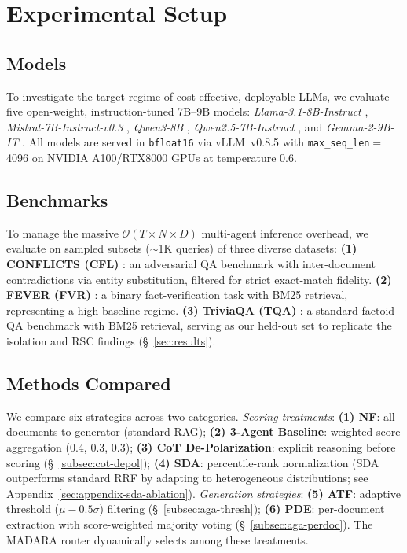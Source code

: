 \documentclass[11pt]{article}
\theoremstyle{definition}
\begin{document}
\section{Experimental Setup}
\label{sec:experiments}

\subsection{Models}
\label{subsec:models}

To investigate the target regime of cost-effective, deployable LLMs, we evaluate five open-weight, instruction-tuned 7B--9B models:
\textit{Llama-3.1-8B-Instruct} \citep{grattafiori2024llama},
\textit{Mistral-7B-Instruct-v0.3} \citep{jiang2023mistral7b},
\textit{Qwen3-8B} \citep{yang2025qwen3},
\textit{Qwen2.5-7B-Instruct} \citep{qwen2025qwen25technicalreport},
and \textit{Gemma-2-9B-IT} \citep{team2024gemma}.
All models are served in \texttt{bfloat16} via vLLM~v0.8.5 \citep{kwon2023efficient} with \texttt{max\_seq\_len}\(=\)4096 on NVIDIA A100/RTX8000 GPUs at temperature \(0.6\).

\subsection{Benchmarks}
\label{subsec:benchmarks}

To manage the massive \(\mathcal{O}(T \times N \times D)\) multi-agent inference overhead, we evaluate on sampled subsets (\({\sim}\)1K queries) of three diverse datasets: \textbf{(1) CONFLICTS (CFL)} \citep{xie2023adaptive}: an adversarial QA benchmark with inter-document contradictions via entity substitution, filtered for strict exact-match fidelity. \textbf{(2) FEVER (FVR)} \citep{thorne2018fever}: a binary fact-verification task with BM25 retrieval, representing a high-baseline regime. \textbf{(3) TriviaQA (TQA)} \citep{joshi2017triviaqa}: a standard factoid QA benchmark with BM25 retrieval, serving as our held-out set to replicate the isolation and RSC findings (\S~\ref{sec:results}).

\subsection{Methods Compared}
\label{subsec:methods}

We compare six strategies across two categories. \emph{Scoring treatments}: \textbf{(1) NF}: all documents to generator (standard RAG); \textbf{(2) 3-Agent Baseline}: weighted score aggregation (0.4, 0.3, 0.3); \textbf{(3) CoT De-Polarization}: explicit reasoning before scoring (\S~\ref{subsec:cot-depol}); \textbf{(4) SDA}: percentile-rank normalization (SDA outperforms standard RRF by adapting to heterogeneous distributions; see Appendix~\ref{sec:appendix-sda-ablation}). \emph{Generation strategies}: \textbf{(5) ATF}: adaptive threshold (\(\mu - 0.5\sigma\)) filtering (\S~\ref{subsec:aga-thresh}); \textbf{(6) PDE}: per-document extraction with score-weighted majority voting (\S~\ref{subsec:aga-perdoc}). The MADARA router dynamically selects among these treatments. 
\end{document}

